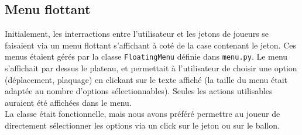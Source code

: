 \documentclass[a4paper,12pt]{article}
\begin{document}
\subsection{Menu flottant}
Initialement, les interractions entre l'utilisateur et les jetons de joueurs se faisaient via un menu flottant s'affichant à coté de la case contenant le jeton.
Ces menus étaient gérés par la classe \texttt{FloatingMenu} définie dans \texttt{menu.py}. Le menu s'affichait par dessus le plateau, et permettait à l'utilisateur de choisir une option (déplacement, plaquage) en clickant sur le texte affiché (la taille du menu était adaptée au nombre d'options sélectionnables). Seules les actions utilisables auraient été affichées dans le menu.\\
La classe était fonctionnelle, mais nous avons préféré permettre au joueur de directement sélectionner les options via un click sur le jeton ou sur le ballon.
\end{document}
